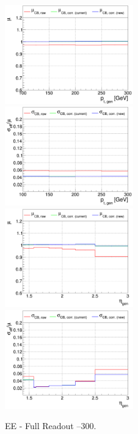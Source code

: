 \begin{figure}
\includegraphics[width=0.495\textwidth]{./plots_pdf/ECAL_plots/plotsNoPU/EE/pdf/FULL/GENPT/EEFULL_GENPT_0100_0300_MuOverBins.pdf}
\includegraphics[width=0.495\textwidth]{./plots_pdf/ECAL_plots/plotsNoPU/EE/pdf/FULL/GENPT/EEFULL_GENPT_0100_0300_EffSigmaOverBins.pdf}
\includegraphics[width=0.495\textwidth]{./plots_pdf/ECAL_plots/plotsNoPU/EE/pdf/FULL/GENETA/EEFULL_GENETA_0100_0300_MuOverBins.pdf}
\includegraphics[width=0.495\textwidth]{./plots_pdf/ECAL_plots/plotsNoPU/EE/pdf/FULL/GENETA/EEFULL_GENETA_0100_0300_EffSigmaOverBins.pdf}
\caption{EE - Full Readout --300\GeV.}
\end{figure}




